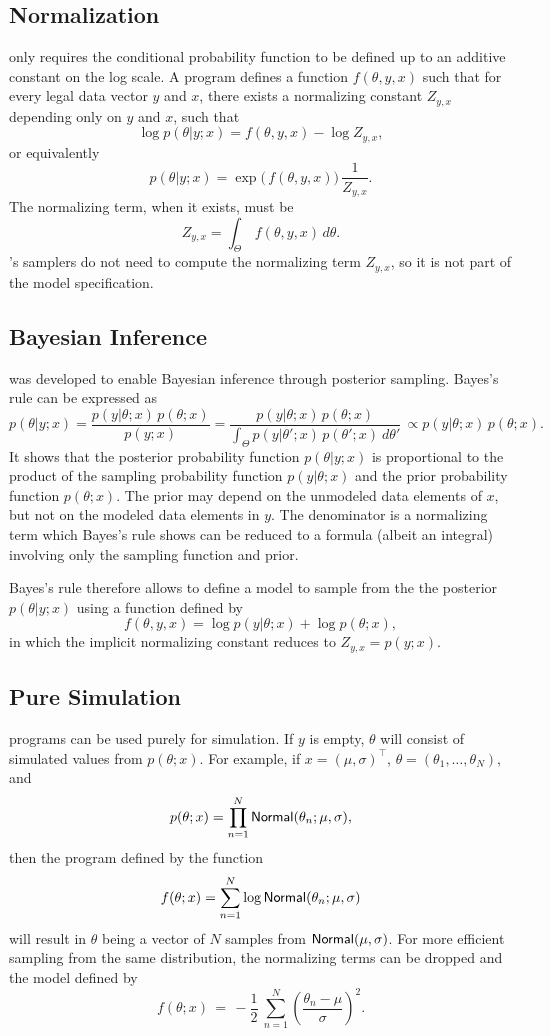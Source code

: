 \subsection{Normalization}

\Stan only requires the conditional probability function to be defined
up to an additive constant on the log scale.  A \Stan program defines
a function $f(\theta,y,x)$ such that for every legal data vector $y$
and $x$, there exists a normalizing constant $Z_{y,x}$ depending only
on $y$ and $x$, such that
%
\[
\log p(\theta|y;x) = f(\theta,y,x) - \log Z_{y,x},
\]
%
or equivalently
%
\[
p(\theta|y;x) = \exp \! \big( \, f(\theta,y,x) \big)  \, \frac{1}{Z_{y,x}}.
\]
%
The normalizing term, when it exists, must be
\[
Z_{y,x} = \int_{\Theta} \, f(\theta,y,x) \, d\theta.
\]
\Stan's samplers do not need to compute the normalizing term
$Z_{y,x}$, so it is not part of the model specification.


\subsection{Bayesian Inference}

\Stan was developed to enable Bayesian inference through posterior
sampling.  Bayes's rule can be expressed as
%
\[
p(\theta|y;x) 
= \frac{p(y|\theta;x) \, p(\theta;x)}{p(y;x)}
= \frac{p(y|\theta;x) \, p(\theta;x)}
       {\int_{\Theta} p(y|\theta';x) \,  p(\theta';x) \ d\theta'} \, 
\propto p(y|\theta;x) \, p(\theta;x).
\]
%
It shows that the posterior probability function $p(\theta|y;x)$ is
proportional to the product of the sampling probability function
$p(y|\theta;x)$ and the prior probability function $p(\theta;x)$.  The
prior may depend on the unmodeled data elements of $x$, but not on the
modeled data elements in $y$.  The denominator is a normalizing term
which Bayes's rule shows can be reduced to a formula (albeit an
integral) involving only the sampling function and prior.

Bayes's rule therefore allows \Stan to define a model to sample from
the the posterior $p(\theta|y;x)$ using a function defined by
\[
f(\theta,y,x) = \log p(y|\theta;x) + \log p(\theta;x),
\]
in which the implicit normalizing constant reduces to $Z_{y,x} =
p(y;x)$.


\subsection{Pure Simulation}

\Stan programs can be used purely for simulation.  If $y$ is empty,
$\theta$ will consist of simulated values from $p(\theta;x)$.  For
example, if $x = (\mu,\sigma)^{\top}$, $\theta =
(\theta_1,\ldots,\theta_N)$, and 
\[
p(\theta;x) =  \prod_{n=1}^N \mbox{\sf Normal}(\theta_n;\mu,\sigma),
\]
then the \Stan program defined by the function
\[
f(\theta;x) = \sum_{n=1}^N \log \mbox{\sf Normal}(\theta_n;\mu,\sigma)
\]
will result in $\theta$ being a vector of $N$ samples from
$\mbox{\sf Normal}(\mu,\sigma)$.  For more efficient sampling from the
same distribution, the normalizing terms can be dropped and the model
defined by
\[
f(\theta;x) \, = \, -\frac{1}{2} \ \sum_{n=1}^N \left( \frac{\theta_n -
    \mu}{\sigma}\right)^2.
\]


